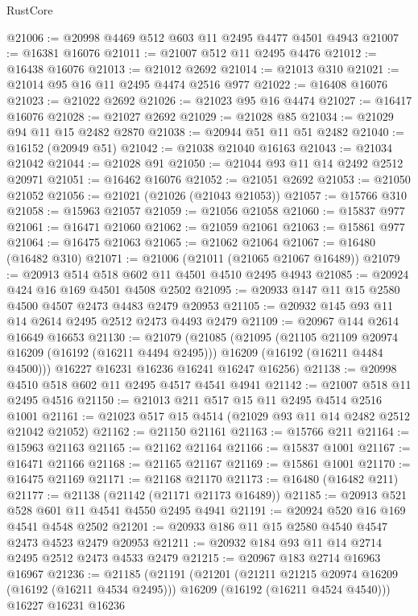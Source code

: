 \begin{lexlean}{RustCore}
\begin{coremodule}
@21006 := @20998 @4469 @512 @603 @11 @2495 @4477 @4501 @4943
@21007 := @16381 @16076
@21011 := @21007 @512 @11 @2495 @4476
@21012 := @16438 @16076
@21013 := @21012 @2692
@21014 := @21013 @310
@21021 := @21014 @95 @16 @11 @2495 @4474 @2516 @977
@21022 := @16408 @16076
@21023 := @21022 @2692
@21026 := @21023 @95 @16 @4474
@21027 := @16417 @16076
@21028 := @21027 @2692
@21029 := @21028 @85
@21034 := @21029 @94 @11 @15 @2482 @2870
@21038 := @20944 @51 @11 @51 @2482
@21040 := @16152 (@20949 @51)
@21042 := @21038 @21040 @16163
@21043 := @21034 @21042
@21044 := @21028 @91
@21050 := @21044 @93 @11 @14 @2492 @2512 @20971
@21051 := @16462 @16076
@21052 := @21051 @2692
@21053 := @21050 @21052
@21056 := @21021 (@21026 (@21043 @21053))
@21057 := @15766 @310
@21058 := @15963 @21057
@21059 := @21056 @21058
@21060 := @15837 @977
@21061 := @16471 @21060
@21062 := @21059 @21061
@21063 := @15861 @977
@21064 := @16475 @21063
@21065 := @21062 @21064
@21067 := @16480 (@16482 @310)
@21071 := @21006 (@21011 (@21065 @21067 @16489))
@21079 := @20913 @514 @518 @602 @11 @4501 @4510 @2495 @4943
@21085 := @20924 @424 @16 @169 @4501 @4508 @2502
@21095 := @20933 @147 @11 @15 @2580 @4500 @4507 @2473 @4483 @2479 @20953
@21105 := @20932 @145 @93 @11 @14 @2614 @2495 @2512 @2473 @4493 @2479
@21109 := @20967 @144 @2614 @16649 @16653
@21130 := @21079
    (@21085
      (@21095
        (@21105 @21109 @20974 @16209 (@16192 (@16211 @4494 @2495)))
        @16209
        (@16192 (@16211 @4484 @4500)))
      @16227
      @16231
      @16236
      @16241
      @16247
      @16256)
@21138 := @20998 @4510 @518 @602 @11 @2495 @4517 @4541 @4941
@21142 := @21007 @518 @11 @2495 @4516
@21150 := @21013 @211 @517 @15 @11 @2495 @4514 @2516 @1001
@21161 := @21023 @517 @15 @4514 (@21029 @93 @11 @14 @2482 @2512 @21042 @21052)
@21162 := @21150 @21161
@21163 := @15766 @211
@21164 := @15963 @21163
@21165 := @21162 @21164
@21166 := @15837 @1001
@21167 := @16471 @21166
@21168 := @21165 @21167
@21169 := @15861 @1001
@21170 := @16475 @21169
@21171 := @21168 @21170
@21173 := @16480 (@16482 @211)
@21177 := @21138 (@21142 (@21171 @21173 @16489))
@21185 := @20913 @521 @528 @601 @11 @4541 @4550 @2495 @4941
@21191 := @20924 @520 @16 @169 @4541 @4548 @2502
@21201 := @20933 @186 @11 @15 @2580 @4540 @4547 @2473 @4523 @2479 @20953
@21211 := @20932 @184 @93 @11 @14 @2714 @2495 @2512 @2473 @4533 @2479
@21215 := @20967 @183 @2714 @16963 @16967
@21236 := @21185
    (@21191
      (@21201
        (@21211 @21215 @20974 @16209 (@16192 (@16211 @4534 @2495)))
        @16209
        (@16192 (@16211 @4524 @4540)))
      @16227
      @16231
      @16236

\end{coremodule}
\end{lexlean}
